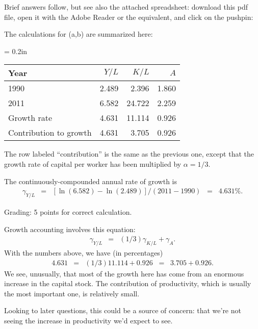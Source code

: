 \documentclass[letterpaper,12pt]{exam}
\begin{document}
\begin{questions}
\begin{solution}
Brief answers follow,
but see also the attached spreadsheet:
download this pdf file, open it with the Adobe Reader or the equivalent,
and click on the pushpin:

The calculations for (a,b) are summarized here:
%
\begin{center}
    \tabcolsep = 0.2in
    \begin{tabular}{lrrr}
    \toprule
    Year            &  $ Y/L $   &  $K/L$  & $A$  \\
    \midrule
    1990            &   2.489  &   2.396  & 1.860  \\
    2011            &   6.582  &  24.722  & 2.259 \\
    Growth rate     &   4.631  &  11.114 & 0.926 \\
    Contribution to growth
                    &   4.631  &  3.705 & 0.926 \\
    \bottomrule
    \end{tabular}
\end{center}
The row labeled ``contribution'' is the same as the previous
one, except that the growth rate of capital per worker has
been multiplied by $\alpha = 1/3$.

\begin{parts}
\item The continuously-compounded annual rate of growth is
\begin{eqnarray*}
    \gamma_{Y/L} &=& [\ln (6.582) - \ln(2.489)]/(2011-1990) \;\;=\;\; 4.631 \%.
\end{eqnarray*}

Grading:  5 points for correct calculation.

\item Growth accounting involves this equation:
\begin{eqnarray*}
    \gamma_{Y/L} &=& (1/3) \gamma_{K/L} + \gamma_{A} .
\end{eqnarray*}
With the numbers above, we have (in percentages)
\begin{eqnarray*}
    4.631 &=& (1/3) 11.114  + 0.926  \;\;=\;\; 3.705  + 0.926.
\end{eqnarray*}
We see, unusually, that most of the growth here has come from
an enormous increase in the capital stock.
The contribution of productivity, which is usually the most important one,
is relatively small.

Looking to later questions, this could be a source of concern:
that we're not seeing the increase in productivity we'd expect to see.


\end{parts}
\end{solution}
\end{questions}
\end{document}

